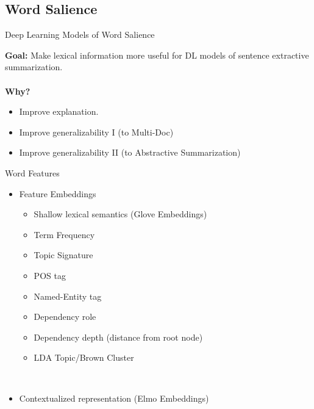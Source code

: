 \subsection{Word Salience}

\begin{frame}{Deep Learning Models of Word Salience}


 
\textbf{Goal:} Make lexical information more useful for DL models of 
sentence extractive summarization.\\
~\\
\textbf{Why?} 
\begin{itemize}
 \item Improve explanation.
 \item Improve generalizability I (to Multi-Doc)
 \item Improve generalizability II (to Abstractive Summarization)
\end{itemize}
\end{frame}

\begin{frame}{Word Features}

    \begin{itemize}
        \item Feature Embeddings
        \begin{itemize}
        \item Shallow lexical semantics (Glove Embeddings)
        \item Term Frequency 
        \item Topic Signature 
        \item POS tag
        \item Named-Entity tag
        \item Dependency role
        \item Dependency depth (distance from root node)
        \item LDA Topic/Brown Cluster 
        \end{itemize}
~\\
        \item Contextualized representation (Elmo Embeddings)
    \end{itemize}


\end{frame}

